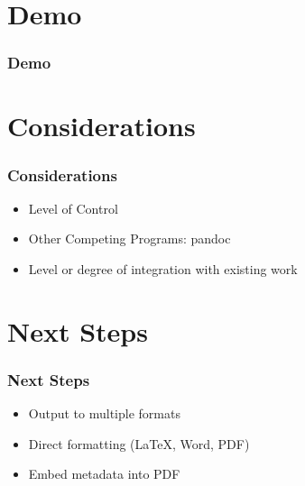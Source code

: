 \documentclass{beamer}
\begin{document}
\section{Demo}
\begin{frame}
\frametitle{Demo}
\end{frame}

\section{Considerations}
\begin{frame}
\frametitle{Considerations}
    \begin{itemize}
    \item Level of Control
    \item Other Competing Programs: pandoc
    \item Level or degree of integration with existing work
    \end{itemize}
\end{frame}

\section{Next Steps}
\begin{frame}
\frametitle{Next Steps}
    \begin{itemize}
    \item Output to multiple formats
    \item Direct formatting (LaTeX, Word, PDF)
    \item Embed metadata into PDF
    \end{itemize}
\end{frame}
\end{document}
